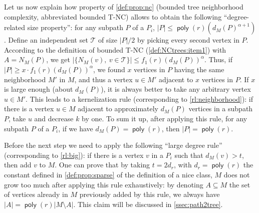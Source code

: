 \documentclass{amsart}
\newcommand{\mT}{\mathcal{T}}
\DeclareMathOperator\poly{\textsf{poly}}
\newcommand{\ruleref}[1]{\hyperref[#1]{\ref*{#1}}}
\begin{document}
Let us now explain how property of \autoref{def:prop:nc} (bounded tree neighborhood complexity, abbreviated bounded T-NC) allows to obtain the following ``degree-related size property'': for any subpath $P$ of a $P_i$, $|P| \le \poly(r)(d_M(P)^{\alpha+1})$. Define an independent set $\mT$ of size $|P|/2$ by picking every second vertex in $P$. According to the definition of bounded T-NC (\autoref{def:NCtrees:item1}) with $A=N_M(P)$, we get
$|\{N_M(v),~v \in \mT \}| \leq f_1(r) (d_M(P))^{\alpha}$. Thus, if $|P| \ge x \cdot f_1(r) (d_M(P))^{\alpha}$, we found $x$ vertices in $P$ having the same neighborhood $M'$ in $M$, and thus a vertex $u \in M'$ adjacent to $x$ vertices in $P$. 
If $x$ is large enough (about $d_M(P)$), it is always better to take any arbitrary vertex $u \in M'$.
This leads to a kernelization rule (corresponding to \ruleref{rl:neighborhood}): if there is a vertex $u \in M$ adjacent to approximately $d_M(P)$ vertices in a subpath $P$, take $u$ and decrease $k$ by one.
To sum it up, after applying this rule, for any subpath $P$ of a $P_i$, if we have $d_M(P)=\poly(r)$, then $|P|=\poly(r)$.

Before the next step we need to apply the following ``large degree rule'' (corresponding to \ruleref{rl:big}): if there is a vertex $v$ in a $P_i$
such that $d_M(v) > t$, then add $v$ to $M$.
One can prove that by taking $t=2d_r$, with $d_r=\poly(r)$ the constant defined in \autoref{def:prop:sparse} of the definition of a nice class, $M$ does not grow too much after applying this rule exhaustively: by denoting $A\subseteq M$ the set of vertices already in $M$ previously added by this rule, we always have $|A|=\poly(r)|M\setminus A|$. This claim will be discussed in \autoref{ssec:path2tree}.
\end{document}
